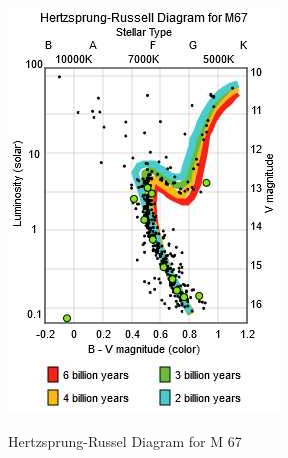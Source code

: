 \documentclass[11pt]{article}
\begin{document}
\begin{figure}[h]
\caption{Hertzsprung-Russel Diagram for M 67}
\center
\includegraphics[scale=0.5]{figures/hr.jpg}
\label{fig:hr-m67}
\end{figure}
\end{document}
